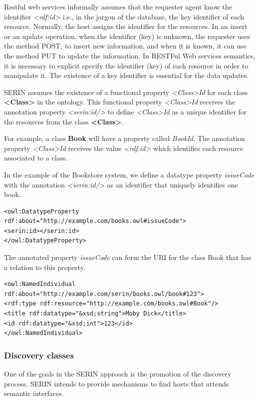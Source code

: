 \documentclass{singlecol-new}
\theoremstyle{TH}{
\newtheorem{lemma}{Lemma}
\newtheorem{theorem}[lemma]{Theorem}
\newtheorem{corrolary}[lemma]{Corrolary}
\newtheorem{conjecture}[lemma]{Conjecture}
\newtheorem{proposition}[lemma]{Proposition}
\newtheorem{claim}[lemma]{Claim}
\newtheorem{stheorem}[lemma]{Wrong Theorem}
\newtheorem{algorithm}{Algorithm}
}
\theoremstyle{THrm}{
\newtheorem{definition}{Definition}[section]
\newtheorem{question}{Question}[section]
\newtheorem{remark}{Remark}
\newtheorem{scheme}{Scheme}
}
\theoremstyle{THhit}{
\newtheorem{case}{Case}[section]
}
\begin{document}
Restful web services informally assumes that the requester agent know the identifier \textit{<rdf:id>} i.e., in the jargon of the database, the key identifier of each resource. 
Normally, the host assigns the identifier for the resources.
In an insert or an update operation, when the identifier (key) is unknown, the requester uses the method POST, to insert new information, and when it is known, it can use the method PUT to update the information.
In RESTFul Web services semantics, it is necessary to explicit specify the identifier (key) of each resource in order to manipulate it.
The existence of a key identifier is essential for the data updates.

SERIN assumes the existence of a functional property \textit{<Class>Id} for each class \textbf{<Class>} in the ontology. 
This functional property \textit{<Class>Id} receives the annotation property \textit{<serin:id/>} to define \textit{<Class>Id} as a unique identifier for the resources from the class \textbf{<Class>}.

For example, a class \textbf{Book} will have a property called \textit{BookId}.
The annotation property \textit{<Class>Id} receives the value \textit{<rdf:id>} which identifies each resource associated to a class.

In the example of the Bookstore system, we define a datatype property \textit{issueCode} with the annotation \textit{<serin:id/>} as an identifier that uniquely identifies one book. 

\begin{lstlisting}[breaklines=true]
<owl:DatatypeProperty rdf:about="http://example.com/books.owl#issueCode">
<serin:id></serin:id>
</owl:DatatypeProperty>
\end{lstlisting}

The annotated property \textit{issueCode} can form the URI for the class Book that has a relation to this property.

\begin{lstlisting}[breaklines=true]
<owl:NamedIndividual rdf:about="http://example.com/serin/books.owl/book#123">
<rdf:type rdf:resource="http://example.com/books.owl#Book"/>
<title rdf:datatype="&xsd;string">Moby Dick</title>
<id rdf:datatype="&xsd;int">123</id>
</owl:NamedIndividual>
\end{lstlisting}

\subsubsection{Discovery classes}
\label{sec:discoveryclass}
One of the goals in the SERIN approach is the promotion of the discovery process. SERIN intends to provide mechanisms to find hosts that attends semantic interfaces.
\end{document}
